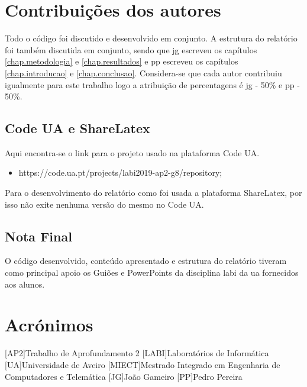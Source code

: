 \documentclass{report}
\begin{document}
\chapter*{Contribuições dos autores}
Todo o código foi discutido e desenvolvido em conjunto. A estrutura do relatório foi também discutida em conjunto, sendo  que \ac{jg} escreveu os capítulos \autoref{chap.metodologia} e \autoref{chap.resultados} e \ac{pp} escreveu os capítulos \autoref{chap.introducao} e \autoref{chap.conclusao}. Considera-se que cada autor contribuiu igualmente para este trabalho logo a atribuição de percentagens é \ac{jg} - 50\%  e \ac{pp} - 50\%.

\section{Code UA e ShareLatex}
Aqui encontra-se o link para o projeto usado na plataforma Code UA.
\begin{itemize}
\item {https://code.ua.pt/projects/labi2019-ap2-g8/repository};
\end{itemize}

Para o desenvolvimento do relatório como foi usada a plataforma ShareLatex, por isso não exite nenhuma versão do mesmo no Code UA.

\section{Nota Final}
\cite{labi}

 O código desenvolvido, conteúdo apresentado e estrutura do relatório tiveram como principal apoio os Guiões e PowerPoints da disciplina  \ac{labi} da \ac{ua} fornecidos aos alunos.


\chapter*{Acrónimos}
\begin{acronym}
[AP2]{Trabalho de Aprofundamento 2}
[LABI]{Laboratórios de Informática}
[UA]{Universidade de Aveiro}
[MIECT]{Mestrado Integrado em Engenharia de Computadores e Telemática}
[JG]{João Gameiro}
[PP]{Pedro Pereira}
\end{acronym}


\printbibliography
\end{document}
